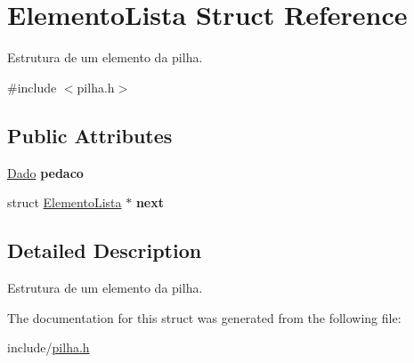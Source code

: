 \hypertarget{struct_elemento_lista}{}\section{Elemento\+Lista Struct Reference}
\label{struct_elemento_lista}


Estrutura de um elemento da pilha.  




{\ttfamily \#include $<$pilha.\+h$>$}

\subsection*{Public Attributes}
\begin{DoxyCompactItemize}
\item 
\mbox{\label{struct_elemento_lista_aeee1aaec4797ddb33482c04bf722407c}} 
\mbox{\hyperlink{pilha_8h_a5fc4fd986b888c946351fdd1c19309da}{Dado}} {\bfseries pedaco}
\item 
\mbox{\label{struct_elemento_lista_adf0fa82cc81d002350ab358e13b5c10e}} 
struct \mbox{\hyperlink{struct_elemento_lista}{Elemento\+Lista}} $\ast$ {\bfseries next}
\end{DoxyCompactItemize}


\subsection{Detailed Description}
Estrutura de um elemento da pilha. 

The documentation for this struct was generated from the following file\+:\begin{DoxyCompactItemize}
\item 
include/\mbox{\hyperlink{pilha_8h}{pilha.\+h}}\end{DoxyCompactItemize}
